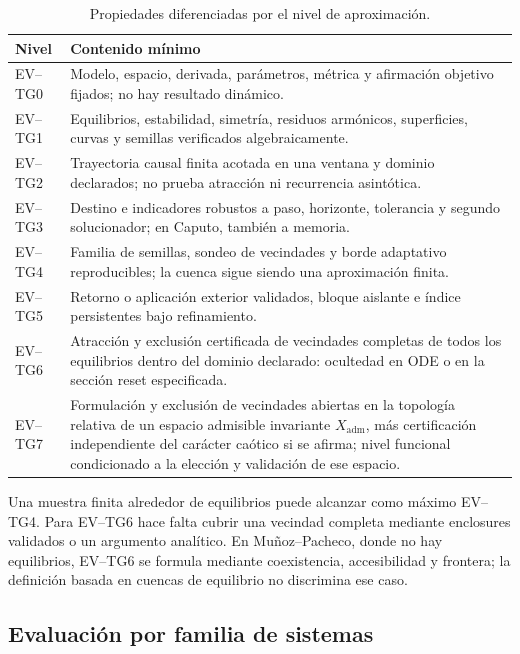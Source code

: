 \begin{table}[H]
\centering
\caption{Propiedades diferenciadas por el nivel de aproximación.}
\label{camp:tab-evidence-levels}
\begin{tabularx}{\linewidth}{@{}lY@{}}
\toprule
Nivel & Contenido mínimo\\
\midrule
EV--TG0 & Modelo, espacio, derivada, parámetros, métrica y afirmación objetivo
fijados; no hay resultado dinámico.\\
EV--TG1 & Equilibrios, estabilidad, simetría, residuos armónicos, superficies,
curvas y semillas verificados algebraicamente.\\
EV--TG2 & Trayectoria causal finita acotada en una ventana y dominio declarados;
no prueba atracción ni recurrencia asintótica.\\
EV--TG3 & Destino e indicadores robustos a paso, horizonte, tolerancia y segundo
solucionador; en Caputo, también a memoria.\\
EV--TG4 & Familia de semillas, sondeo de vecindades y borde adaptativo
reproducibles; la cuenca sigue siendo una aproximación finita.\\
EV--TG5 & Retorno o aplicación exterior validados, bloque aislante e índice
persistentes bajo refinamiento.\\
EV--TG6 & Atracción y exclusión certificada de vecindades completas de todos los
equilibrios dentro del dominio declarado: ocultedad en ODE o en la sección
reset especificada.\\
EV--TG7 & Formulación y exclusión de vecindades abiertas en la topología relativa
de un espacio admisible invariante \(X_{\mathrm{adm}}\), más certificación
independiente del carácter caótico si se afirma; nivel funcional condicionado
a la elección y validación de ese espacio.\\
\bottomrule
\end{tabularx}
\end{table}

Una muestra finita alrededor de equilibrios puede alcanzar como máximo
EV--TG4. Para EV--TG6 hace falta cubrir una vecindad completa mediante
enclosures validados o un argumento analítico. En Muñoz--Pacheco, donde no hay
equilibrios, EV--TG6 se formula mediante coexistencia, accesibilidad y frontera;
la definición basada en cuencas de equilibrio no discrimina ese caso.

\subsection{Evaluación por familia de sistemas}
\label{camp:case-execution}

